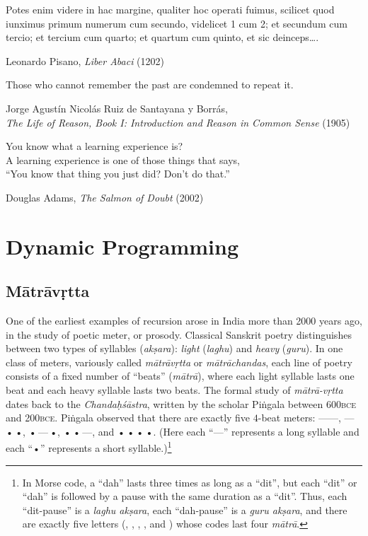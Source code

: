 \epigraph{Potes enim videre in hac margine, qualiter hoc operati fuimus, scilicet quod iunximus primum numerum cum secundo, videlicet 1 cum 2; et secundum cum tercio; et tercium cum quarto; et quartum cum quinto, et sic deinceps\dots.\par [You can see in the margin here how we have worked this; clearly, we combined the first number with the second, namely 1 with 2, and the second with the third, and the third with the fourth, and the fourth with the fifth, and so forth\dots.]}{Leonardo Pisano, \textit{Liber Abaci} (1202)}

\epigraph{Those who cannot remember the past are condemned to repeat it.}{Jorge Agustín Nicolás Ruiz de Santayana y Borrás,\\\textit{The Life of Reason, Book I: Introduction and Reason in Common Sense} (1905)}

\epigraph{You know what a learning experience is?\\A learning experience is one of those things that says,\\“You know that thing you just did? Don’t do that.”}{Douglas Adams, \textit{The Salmon of Doubt} (2002)}

\chapter{Dynamic Programming}
\label{ch:3}

\section{M\=atr\=av\d{r}tta}
\label{sec:3.1}

One of the earliest examples of recursion arose in India more than 2000 years ago, in the study of poetic meter, or prosody.
Classical Sanskrit poetry distinguishes between two types of syllables (\textit{ak\d{s}ara}): \textit{light} (\textit{laghu}) and \textit{heavy} (\textit{guru}).
In one class of meters, variously called \textit{m\=atr\=av\d{r}tta} or \textit{m\=atr\=achandas}, each line of poetry consists of a fixed number of “beats” (\textit{m\=atr\=a}), where each light syllable lasts one beat and each heavy syllable lasts two beats.
The formal study of \textit{m\=atr\=a-v\d{r}tta} dates back to the \textit{Chanda\d{h}\'s\=astra}, written by the scholar Pi\.{n}gala between 600\textsc{bce} and 200\textsc{bce}.
Pi\.{n}gala observed that there are exactly five $4$-beat meters: ——, —\,•\,•, •\,—\,•, •\,•\,—, and •\,•\,•\,•.
(Here each “—” represents a long syllable and each “•” represents a short syllable.)\footnote{In Morse code, a “dah” lasts three times as long as a “dit”, but each “dit” or “dah” is followed by a pause with the same duration as a “dit”. Thus, each “dit-pause” is a \textit{laghu ak\d{s}ara}, each “dah-pause” is a \textit{guru ak\d{s}ara}, and there are exactly five letters (, , , , and ) whose codes last four \textit{m\=atr\=a}.}

